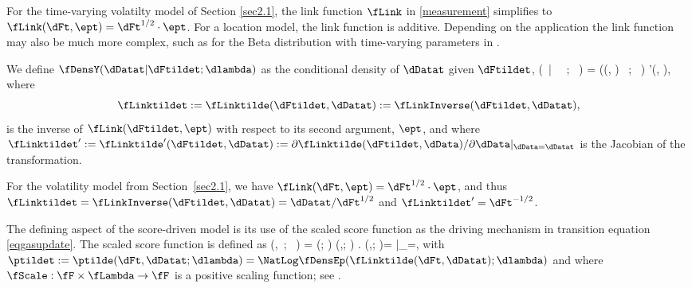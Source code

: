 \begin{exmc} %
For the time-varying volatilty model of Section \ref{sec2.1}, the link function $\fLink$ in \eqref{measurement} simplifies to $\fLink(\dFt,\ept) = \dFt^{1/2}\cdot\ept$.
For a location model, the link function is additive.
Depending on the application the link function may also be much more complex, such as for the Beta distribution with time-varying parameters in \citet{cskl2014}.
\end{exmc}


We define $\fDensY (\dDatat  |  \dFtildet  ;  \dlambda  )$ as the conditional density of $\dDatat$ given 
$\dFtildet$,%
   \fDensY\big(\dDatat \ \big| \ \dFtArgs \ ; \ \dlambda \big) =
   \fDensEp\big(\fLinktilde(\dFtildet  ,  \dDatat) \ ; \ \dlambda \big) \cdot
   \fLinktilde'(\dFtildet , \dDatat ),
\eq
where 
$$\fLinktildet := \fLinktilde(\dFtildet,\dDatat) : =  \fLinkInverse (\dFtildet,\dDatat),$$ 
is the inverse of $\fLink(\dFtildet, \ept)$ with respect to its second argument, $\ept$,
and where $\fLinktildet': = \fLinktilde'(\dFtildet,\dDatat ) : = 
\partial \fLinktilde (\dFtildet,\dData )/ \partial \dData|_{\dData=\dDatat}$ is the Jacobian of the transformation.


\begin{exmc} %
For the volatility model from Section~\ref{sec2.1}, we have $\fLink(\dFt,\ept) = \dFt^{1/2}\cdot\ept$, and thus $\fLinktildet = \fLinkInverse(\dFtildet,\dDatat) = \dDatat/\dFt^{1/2}$ and $\fLinktildet' = \dFt^{-1/2}$.
\end{exmc}

The defining aspect of the score-driven model is its use of the scaled score function as the
driving mechanism in transition equation \eqref{eqgasupdate}.
The scaled score function is defined as
    \fScaledScore \big(\dFtildet ,\dDatat\ ; \  \dlambda \big) = 
    \fScale(\dFtildet; \dlambda) \cdot  \fScoret(\dFtildet,\dDatat; \dlambda)
    \left. \quad  {} \quad \fScoret(\dFtildet,\dDatat; \dlambda)= \right|_{\dF=\dFt},
\eq
with $\ptildet := \ptilde(\dFt,\dDatat ;\dlambda) = 
\NatLog \fDensEp(\fLinktilde(\dFt,\dDatat);\dlambda)$
and where $\fScale:\fF \times \fLambda \to \fF$ is a positive scaling function; see \citet{CKL2013}. 


